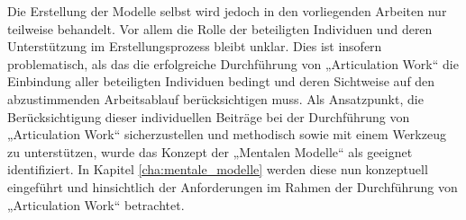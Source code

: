 Die Erstellung der Modelle selbst wird jedoch in den vorliegenden Arbeiten nur teilweise behandelt. Vor allem die Rolle der beteiligten Individuen und deren Unterstützung im Erstellungsprozess bleibt unklar. Dies ist insofern problematisch, als das die erfolgreiche Durchführung von „Articulation Work“ die Einbindung aller beteiligten Individuen bedingt und deren Sichtweise auf den abzustimmenden Arbeitsablauf berücksichtigen muss. Als Ansatzpunkt, die Berücksichtigung dieser individuellen Beiträge bei der Durchführung von „Articulation Work“ sicherzustellen und methodisch sowie mit einem Werkzeug zu unterstützen, wurde das Konzept der „Mentalen Modelle“ als geeignet identifiziert. In Kapitel \ref{cha:mentale_modelle} werden diese nun konzeptuell eingeführt und hinsichtlich der Anforderungen im Rahmen der Durchführung von „Articulation Work“ betrachtet.


